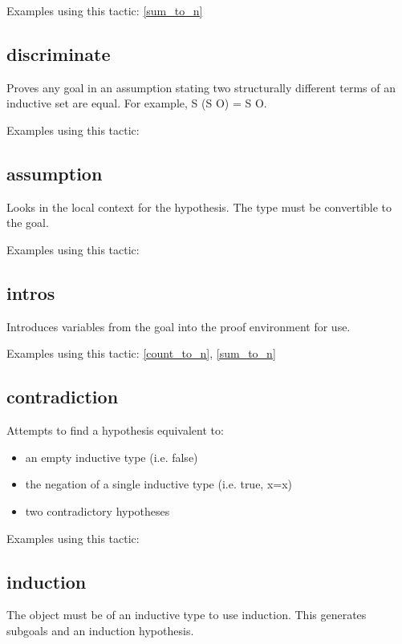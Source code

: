 \noindent
Examples using this tactic: 
\ref{sum_to_n}


\subsection{discriminate} \label{discriminate}
Proves any goal in an assumption stating two structurally different terms of an inductive set are equal. For example, S (S O) = S O.

\noindent
Examples using this tactic: 



\subsection{assumption} \label{assumption}
Looks in the local context for the hypothesis. The type must be convertible to the goal.

\noindent
Examples using this tactic: 



\subsection{intros} \label{intros}
Introduces variables from the goal into the proof environment for use.

\noindent
Examples using this tactic: 
\ref{count_to_n}, 
\ref{sum_to_n}


\subsection{contradiction} \label{contradiction}
Attempts to find a hypothesis equivalent to:
\begin{itemize}
	\item an empty inductive type (i.e. false)
	\item the negation of a single inductive type (i.e. true, x=x)
	\item two contradictory hypotheses
\end{itemize}

\noindent
Examples using this tactic: 



\subsection{induction} \label{induction}
The object must be of an inductive type to use induction. 
This generates subgoals and an induction hypothesis.


